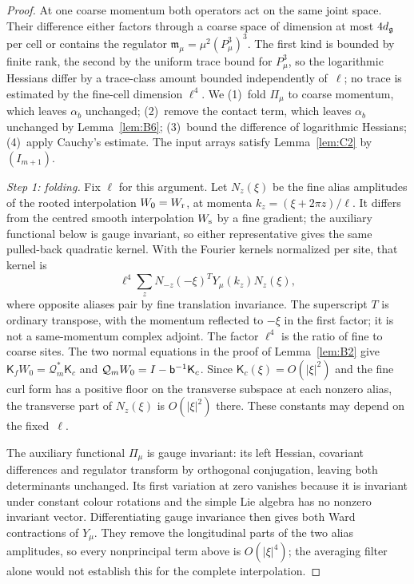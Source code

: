 \begin{proof}
At one coarse momentum both operators act on the same joint space. Their difference either factors through a coarse space of dimension at most $4d_{\mathfrak{g}}$ per cell or contains the regulator $\mathfrak m_\mu=\mu^2(P_\mu^3)^3$. The first kind is bounded by finite rank, the second by the uniform trace bound for $P_\mu^3$, so the logarithmic Hessians differ by a trace-class amount bounded independently of~$\ell$; no trace is estimated by the fine-cell dimension $\ell^4$. We (1)~fold $\Pi_\mu$ to coarse momentum, which leaves $\alpha_b$ unchanged; (2)~remove the contact term, which leaves $\alpha_b$ unchanged by Lemma~\ref{lem:B6}; (3)~bound the difference of logarithmic Hessians; (4)~apply Cauchy's estimate. The input arrays satisfy Lemma~\ref{lem:C2} by~$(I_{m+1})$.

\emph{Step 1: folding.} Fix $\ell$ for this argument. Let $N_z(\xi)$ be the fine alias amplitudes of the rooted interpolation $W_0=W_{\rm r}$, at momenta $k_z=(\xi+2\pi z)/\ell$. It differs from the centred smooth interpolation $W_{\rm s}$ by a fine gradient; the auxiliary functional below is gauge invariant, so either representative gives the same pulled-back quadratic kernel. With the Fourier kernels normalized per site, that kernel is
\begin{equation*}
\ell^4\sum_z N_{-z}(-\xi)^{T}Y_\mu(k_z)N_z(\xi),
\end{equation*}
where opposite aliases pair by fine translation invariance. The superscript $T$ is ordinary transpose, with the momentum reflected to $-\xi$ in the first factor; it is not a same-momentum complex adjoint. The factor $\ell^4$ is the ratio of fine to coarse sites. The two normal equations in the proof of Lemma~\ref{lem:B2} give $\mathsf K_fW_0=\mathcal Q_m^*\mathsf K_c$ and $\mathcal Q_mW_0=I-\mathsf{b}^{-1}\mathsf K_c$. Since $\mathsf K_c(\xi)=O(|\xi|^2)$ and the fine curl form has a positive floor on the transverse subspace at each nonzero alias, the transverse part of $N_z(\xi)$ is $O(|\xi|^2)$ there. These constants may depend on the fixed~$\ell$.

The auxiliary functional $\Pi_\mu$ is gauge invariant: its left Hessian, covariant differences and regulator transform by orthogonal conjugation, leaving both determinants unchanged. Its first variation at zero vanishes because it is invariant under constant colour rotations and the simple Lie algebra has no nonzero invariant vector. Differentiating gauge invariance then gives both Ward contractions of $Y_\mu$. They remove the longitudinal parts of the two alias amplitudes, so every nonprincipal term above is $O(|\xi|^4)$; the averaging filter alone would not establish this for the complete interpolation.


\end{proof}
